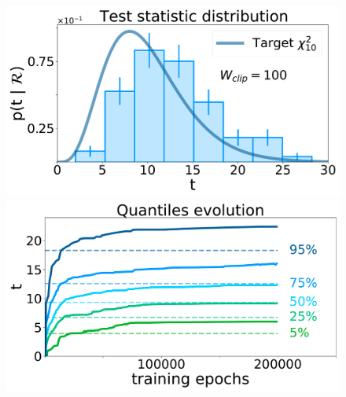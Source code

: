 \documentclass{beamer}
\begin{document}
\begin{frame}
{\begin{columns}[onlytextwidth]
\begin{column}{0.33\textwidth}
						\begin{figure}
							\centering 
							\includegraphics[width=1.0\textwidth]{../PLOTS/DRIFT_TIME/thesis/a_distribution_100_0.pdf}
							\includegraphics[width=1.0\textwidth]{../PLOTS/DRIFT_TIME/thesis/a_quantiles_100_0.pdf}
						\end{figure}

				\end{column}
			\end{columns}

		}

	\end{frame}
\end{document}
